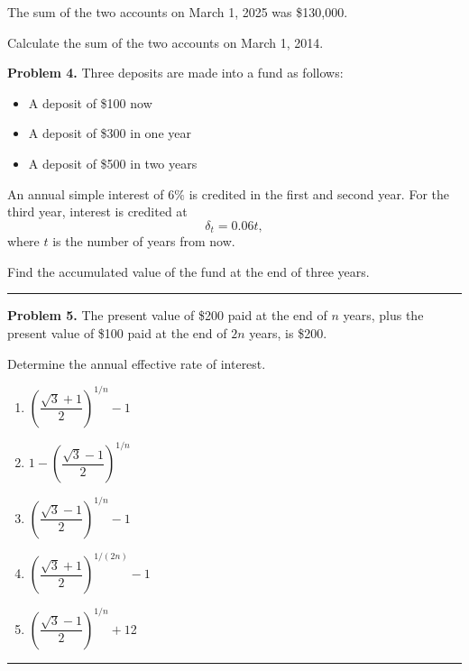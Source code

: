 \documentclass[11pt]{article}
\begin{document}
The sum of the two accounts on March 1, 2025 was \$130{,}000.

Calculate the sum of the two accounts on March 1, 2014.

\medskip



\newpage


\textbf{Problem 4.} Three deposits are made into a fund as follows:
\begin{itemize}[leftmargin=2em]
    \item A deposit of \$100 now
    \item A deposit of \$300 in one year
    \item A deposit of \$500 in two years
\end{itemize}

An annual simple interest of $6\%$ is credited in the first and second year. For the third year, interest is credited at
\[
\delta_t = 0.06t,
\]
where $t$ is the number of years from now.

Find the accumulated value of the fund at the end of three years.

\medskip

\hrule

\medskip

\textbf{Problem 5.} The present value of \$200 paid at the end of $n$ years, plus the present value of \$100 paid at the end of $2n$ years, is \$200.

Determine the annual effective rate of interest.

\medskip

\begin{enumerate}[label=\textbf{\Alph*.}, leftmargin=2.5em]
    \item $\left(\dfrac{\sqrt{3}+1}{2}\right)^{1/n} - 1$
    
    \item $1 - \left(\dfrac{\sqrt{3}-1}{2}\right)^{1/n}$
    
    \item $\left(\dfrac{\sqrt{3}-1}{2}\right)^{1/n} - 1$
    
    \item $\left(\dfrac{\sqrt{3}+1}{2}\right)^{1/(2n)} - 1$
    
    \item $\left(\dfrac{\sqrt{3}-1}{2}\right)^{1/n} + 1$2
\end{enumerate}

\medskip

\hrule

\medskip
\end{document}
